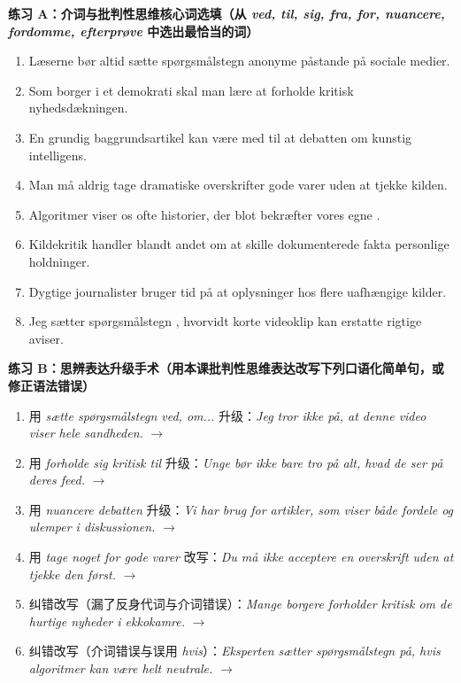
\textbf{练习 A：介词与批判性思维核心词选填（从 \textit{ved, til, sig, fra, for, nuancere, fordomme, efterprøve} 中选出最恰当的词）}
\begin{enumerate}
  \item Læserne bør altid sætte spørgsmålstegn \underline{\hspace{2.2cm}} anonyme påstande på sociale medier.
  \item Som borger i et demokrati skal man lære at forholde \underline{\hspace{2.2cm}} kritisk \underline{\hspace{2.2cm}} nyhedsdækningen.
  \item En grundig baggrundsartikel kan være med til at \underline{\hspace{2.2cm}} debatten om kunstig intelligens.
  \item Man må aldrig tage dramatiske overskrifter \underline{\hspace{2.2cm}} gode varer uden at tjekke kilden.
  \item Algoritmer viser os ofte historier, der blot bekræfter vores egne \underline{\hspace{2.2cm}}.
  \item Kildekritik handler blandt andet om at skille dokumenterede fakta \underline{\hspace{2.2cm}} personlige holdninger.
  \item Dygtige journalister bruger tid på at \underline{\hspace{2.2cm}} oplysninger hos flere uafhængige kilder.
  \item Jeg sætter spørgsmålstegn \underline{\hspace{2.2cm}}, hvorvidt korte videoklip kan erstatte rigtige aviser.
\end{enumerate}

\textbf{练习 B：思辨表达升级手术（用本课批判性思维表达改写下列口语化简单句，或修正语法错误）}
\begin{enumerate}
  \item 用 \textit{sætte spørgsmålstegn ved, om...} 升级：\textit{Jeg tror ikke på, at denne video viser hele sandheden.} $\rightarrow$
  \item 用 \textit{forholde sig kritisk til} 升级：\textit{Unge bør ikke bare tro på alt, hvad de ser på deres feed.} $\rightarrow$
  \item 用 \textit{nuancere debatten} 升级：\textit{Vi har brug for artikler, som viser både fordele og ulemper i diskussionen.} $\rightarrow$
  \item 用 \textit{tage noget for gode varer} 改写：\textit{Du må ikke acceptere en overskrift uden at tjekke den først.} $\rightarrow$
  \item 纠错改写（漏了反身代词与介词错误）：\textit{Mange borgere forholder kritisk om de hurtige nyheder i ekkokamre.} $\rightarrow$
  \item 纠错改写（介词错误与误用 \textit{hvis}）：\textit{Eksperten sætter spørgsmålstegn på, hvis algoritmer kan være helt neutrale.} $\rightarrow$
\end{enumerate}

